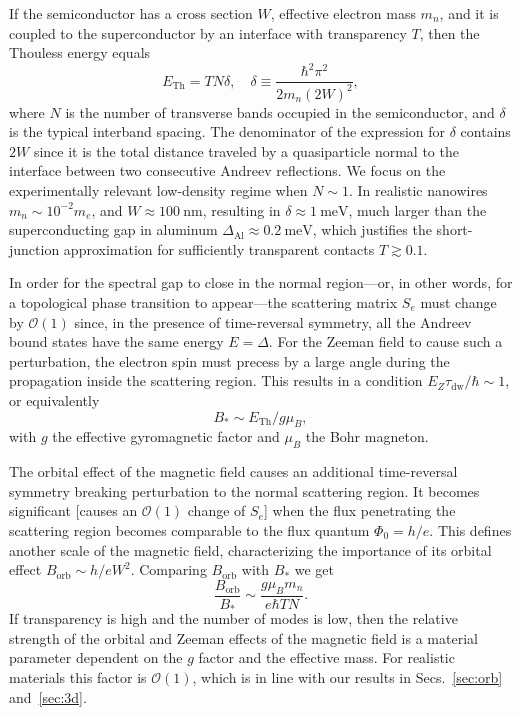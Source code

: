If the semiconductor has a cross section $W$, effective electron mass $m_n$, and it is coupled to the superconductor by an interface with transparency $T$, then the Thouless energy equals
\begin{equation}
\label{eq:e_thouless}
E_\textrm{Th} = TN\delta,\quad \delta\equiv\frac{\hbar^2\pi^2}{2m_n (2W)^2},
\end{equation}
where $N$ is the number of transverse bands occupied in the semiconductor, and $\delta$ is the typical interband spacing.
The denominator of the expression for $\delta$ contains $2W$ since it is the total distance traveled by a quasiparticle normal to the interface between two consecutive Andreev reflections.
We focus on the experimentally relevant low-density regime when $N\sim 1$.
In realistic nanowires $m_n\sim 10^{-2}m_e$, and $W\approx \SI{100}{\nm}$, resulting in $\delta \approx \SI{1}{\meV}$, much larger than the superconducting gap in aluminum $\Delta_\textrm{Al} \approx \SI{0.2}{\meV}$, which justifies the short-junction approximation for sufficiently transparent contacts $T\gtrsim 0.1$.

In order for the spectral gap to close in the normal region---or, in other words, for a topological phase transition to appear---the scattering matrix $S_e$ must change by $\mathcal{O}(1)$ since, in the presence of time-reversal symmetry, all the Andreev bound states have the same energy $E=\Delta$.
For the Zeeman field to cause such a perturbation, the electron spin must precess by a large angle during the propagation inside the scattering region.
This results in a condition $E_Z \tau_\textrm{dw}/\hbar\sim 1$, or equivalently
\begin{equation}
B_* \sim E_\textrm{Th}/g \mu_B,\label{eq:b_critical}
\end{equation}
with $g$ the effective gyromagnetic factor and $\mu_B$ the Bohr magneton.

The orbital effect of the magnetic field causes an additional time-reversal symmetry breaking perturbation to the normal scattering region.
It becomes significant [causes an $\mathcal{O}(1)$ change of $S_e$] when the flux penetrating the scattering region becomes comparable to the flux quantum $\Phi_0=h/e$.
This defines another scale of the magnetic field, characterizing the importance of its orbital effect $B_\textrm{orb}\sim h/eW^2$.
Comparing $B_\textrm{orb}$ with $B_*$ we get
\begin{equation}
\label{eq:relative_field_strength}
\frac{B_\textrm{orb}}{B_*} \sim \frac{g\mu_Bm_n}{e\hbar TN}.
\end{equation}
If transparency is high and the number of modes is low, then the relative strength of the orbital and Zeeman effects of the magnetic field is a material parameter dependent on the $g$ factor and the effective mass.
For realistic materials this factor is $\mathcal{O}(1)$, which is in line with our results in Secs.~\ref{sec:orb} and~\ref{sec:3d}.

